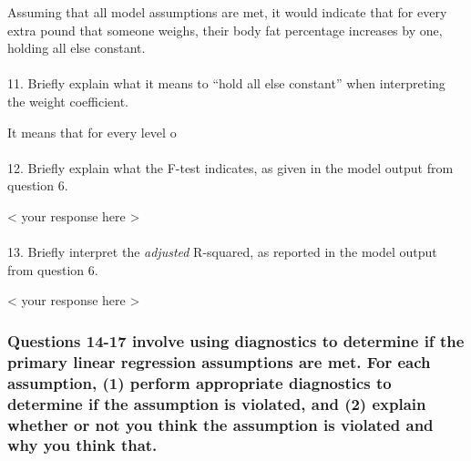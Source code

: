 \documentclass[
  letterpaper,
  DIV=11,
  numbers=noendperiod]{scrartcl}
\makeatletter
\let\oldparagraph\paragraph
\renewcommand{\paragraph}{
    \@ifstar
      \xxxParagraphStar
      \xxxParagraphNoStar
  }
\newcommand{\xxxParagraphStar}[1]{\oldparagraph*{#1}\mbox{}}
\newcommand{\xxxParagraphNoStar}[1]{\oldparagraph{#1}\mbox{}}
\makeatother
\begin{document}
Assuming that all model assumptions are met, it would indicate that for
every extra pound that someone weighs, their body fat percentage
increases by one, holding all else constant.

\paragraph{11. Briefly explain what it means to ``hold all else
constant'' when interpreting the weight
coefficient.}\label{briefly-explain-what-it-means-to-hold-all-else-constant-when-interpreting-the-weight-coefficient.}

It means that for every level o

\paragraph{12. Briefly explain what the F-test indicates, as given in
the model output from question
6.}\label{briefly-explain-what-the-f-test-indicates-as-given-in-the-model-output-from-question-6.}

\textless{} your response here \textgreater{}

\paragraph{\texorpdfstring{13. Briefly interpret the \emph{adjusted}
R-squared, as reported in the model output from question
6.}{13. Briefly interpret the adjusted R-squared, as reported in the model output from question 6.}}\label{briefly-interpret-the-adjusted-r-squared-as-reported-in-the-model-output-from-question-6.}

\textless{} your response here \textgreater{}

\subsubsection{Questions 14-17 involve using diagnostics to determine if
the primary linear regression assumptions are met. For each assumption,
(1) perform appropriate diagnostics to determine if the assumption is
violated, and (2) explain whether or not you think the assumption is
violated and why you think
that.}\label{questions-14-17-involve-using-diagnostics-to-determine-if-the-primary-linear-regression-assumptions-are-met.-for-each-assumption-1-perform-appropriate-diagnostics-to-determine-if-the-assumption-is-violated-and-2-explain-whether-or-not-you-think-the-assumption-is-violated-and-why-you-think-that.}
\end{document}
